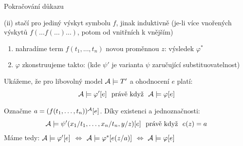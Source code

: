 \documentclass{beamer}
\begin{document}
\begin{frame}{Pokračování důkazu}

    \pause 
    \alert{(ii)} stačí pro jediný výskyt symbolu $f$, jinak induktivně (je-li více vnořených výskytů $f(\dots f(\dots)\dots)$, potom od vnitřních k vnějším)

    \pause 
    \begin{enumerate}
    \item  nahradíme term $f(t_1,\dots,t_n)$ \alert{novou} proměnnou $z$: \alert{výsledek $\varphi^*$} \pause 
    \item $\varphi$ zkonstruujeme takto: 
     (kde $\psi'$ je varianta $\psi$ zaručující substituovatelnost)
    \end{enumerate}\pause 

    Ukážeme, že pro libovolný model $\mathcal{A}\models T'$ a ohodnocení $e$ platí:
    $$
    \mathcal{A}\models\varphi'[e]\ \text{ právě když }\ \mathcal{A}\models\varphi[e]
    $$\pause 
      
    Označme \alert{$a=(f(t_1,\dots,t_n))^{\mathcal{A}}[e]$}. Díky existenci a jednoznačnosti:
    $$
    \A\models\psi'(x_1/t_1,\dots,x_n/t_n,y/z)[e]\ \text{ právě když }\ e(z)=a 
    $$\pause 
    Máme tedy: $\mathcal{A}\models\varphi'[e]$ $\Leftrightarrow$ $\mathcal{A}\models\varphi^*[e(z/a)]$ $\Leftrightarrow$ $\mathcal{A}\models\varphi[e]$ \hfill\qedsymbol    

\end{frame}
\end{document}
